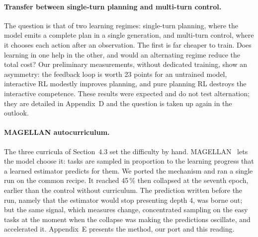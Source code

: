 \documentclass[11pt,a4paper]{article}
\begin{document}
\paragraph{Transfer between single-turn planning and multi-turn control.} The question is that of two learning regimes: single-turn planning, where the model emits a complete plan in a single generation, and multi-turn control, where it chooses each action after an observation. The first is far cheaper to train. Does learning in one help in the other, and would an alternating regime reduce the total cost? Our preliminary measurements, without dedicated training, show an asymmetry: the feedback loop is worth 23 points for an untrained model, interactive RL modestly improves planning, and pure planning RL destroys the interactive competence. These results were expected and do not test alternation; they are detailed in Appendix~D and the question is taken up again in the outlook.

\paragraph{MAGELLAN autocurriculum.} The three curricula of Section~4.3 set the difficulty by hand. MAGELLAN~\cite{gaven2025magellan} lets the model choose it: tasks are sampled in proportion to the learning progress that a learned estimator predicts for them. We ported the mechanism and ran a single run on the common recipe. It reached 45\,\% then collapsed at the seventh epoch, earlier than the control without curriculum. The prediction written before the run, namely that the estimator would stop presenting depth 4, was borne out; but the same signal, which measures change, concentrated sampling on the easy tasks at the moment when the collapse was making the predictions oscillate, and accelerated it. Appendix~E presents the method, our port and this reading.
\end{document}
